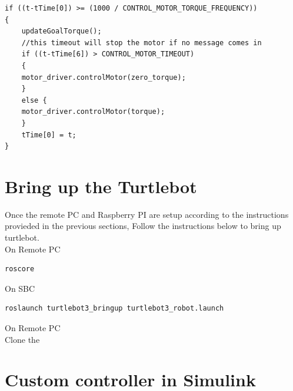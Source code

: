 \documentclass[12]{article}
\begin{document}
\begin{lstlisting}[style=C++]
if ((t-tTime[0]) >= (1000 / CONTROL_MOTOR_TORQUE_FREQUENCY))
{
    updateGoalTorque();
    //this timeout will stop the motor if no message comes in
    if ((t-tTime[6]) > CONTROL_MOTOR_TIMEOUT) 
    {
    motor_driver.controlMotor(zero_torque);
    } 
    else {
    motor_driver.controlMotor(torque);
    }
    tTime[0] = t;
}
\end{lstlisting}

\newpage

\section{Bring up the Turtlebot}
Once the remote PC and Raspberry PI are setup according to the instructions provieded in the previous sections, 
Follow the instructions below to bring up turtlebot.  \\
On Remote PC
\begin{lstlisting}[style=bash]
    roscore
\end{lstlisting}
On SBC
\begin{lstlisting}[style=bash]
    roslaunch turtlebot3_bringup turtlebot3_robot.launch
\end{lstlisting}

On Remote PC\\
Clone the 

\newpage

\section{Custom controller in Simulink}
\end{document}
